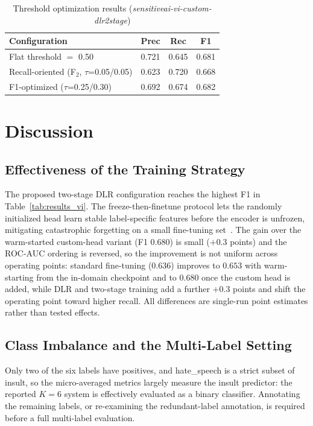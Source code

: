\documentclass[runningheads]{llncs}
\begin{document}
\begin{table}
\centering\footnotesize
\caption{Threshold optimization results (\textit{sensitiveai-vi-custom-dlr2stage})}\label{tab:threshold}
\begin{tabular}{@{}lccc@{}}
\hline
\textbf{Configuration} & \textbf{Prec} & \textbf{Rec} & \textbf{F1} \\
\hline
Flat threshold $=$ 0.50 & 0.721 & 0.645 & 0.681 \\
Recall-oriented (F${}_2$, $\tau$=0.05/0.05) & 0.623 & 0.720 & 0.668 \\
F1-optimized ($\tau$=0.25/0.30) & 0.692 & 0.674 & 0.682 \\
\hline
\end{tabular}
\end{table}

\section{Discussion}
\label{sec:discussion}

\subsection{Effectiveness of the Training Strategy}

The proposed two-stage DLR configuration reaches the highest F1 in Table~\ref{tab:results_vi}. The freeze-then-finetune protocol lets the randomly initialized head learn stable label-specific features before the encoder is unfrozen, mitigating catastrophic forgetting on a small fine-tuning set~\cite{goodfellow2013}. The gain over the warm-started custom-head variant (F1 $0.680$) is small ($+0.3$ points) and the ROC-AUC ordering is reversed, so the improvement is not uniform across operating points: standard fine-tuning ($0.636$) improves to $0.653$ with warm-starting from the in-domain checkpoint and to $0.680$ once the custom head is added, while DLR and two-stage training add a further $+0.3$ points and shift the operating point toward higher recall. All differences are single-run point estimates rather than tested effects.

\subsection{Class Imbalance and the Multi-Label Setting}

Only two of the six labels have positives, and hate\_speech is a strict subset of insult, so the micro-averaged metrics largely measure the insult predictor: the reported $K=6$ system is effectively evaluated as a binary classifier. Annotating the remaining labels, or re-examining the redundant-label annotation, is required before a full multi-label evaluation.
\end{document}
